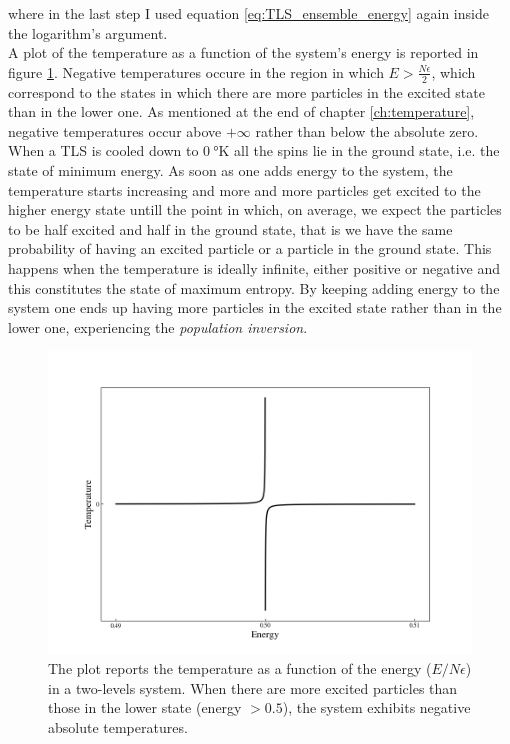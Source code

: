 where in the last step I used equation \ref{eq:TLS_ensemble_energy} again inside the logarithm's argument. \\
A plot of the temperature as a function of the system's energy is reported in figure \ref{fig:temperature_TLS}. Negative temperatures occure in the region in which $E > \frac{N\epsilon}{2}$, which correspond to the states in which there are more particles 
in the excited state than in the lower one. As mentioned at the end of chapter \ref{ch:temperature}, negative temperatures occur above $+\infty$ rather than below the absolute zero. When a TLS is cooled down to $\SI{0}{\degree\kelvin}$ all the spins lie in the ground state, i.e. the state of minimum energy.
As soon as one adds energy to the system, the temperature starts increasing and more and more particles get excited to the higher energy state untill the point in which, on average, we expect the particles to be half excited and half in the ground state, that is we have the same probability 
of having an excited particle or a particle in the ground state. This happens when the temperature is ideally infinite, either positive or negative and this constitutes the state of maximum entropy. By keeping adding energy to the system one ends up having more particles in the excited state rather than in the lower one,
experiencing the \emph{population inversion}. \\
\begin{figure}[h]
    \centering 
    \includegraphics[scale=0.65]{images/temperature_TLS.png}
    \caption{The plot reports the temperature as a function of the energy ($E/N\epsilon$) in a two-levels system. When there are more excited particles than those in the lower state (energy $> 0.5$), the system exhibits negative absolute temperatures.}
    \label{fig:temperature_TLS}
\end{figure}
